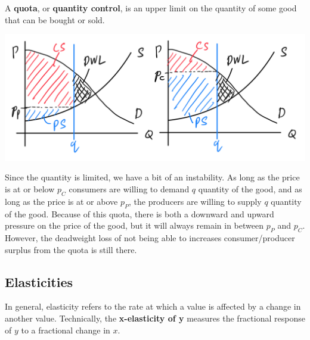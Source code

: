 \documentclass{article}
\begin{document}
    \begin{definition}[Quotas]
      A \textbf{quota}, or \textbf{quantity control}, is an upper limit on the quantity of some good that can be bought or sold. 
      \begin{center}
        \includegraphics[scale=0.25]{img/Quota_DWL.PNG}
      \end{center}
      Since the quantity is limited, we have a bit of an instability. As long as the price is at or below $p_C$ consumers are willing to demand $q$ quantity of the good, and as long as the price is at or above $p_P$, the producers are willing to supply $q$ quantity of the good. Because of this quota, there is both a downward and upward pressure on the price of the good, but it will always remain in between $p_P$ and $p_C$. However, the deadweight loss of not being able to increases consumer/producer surplus from the quota is still there. 
    \end{definition}

  \subsection{Elasticities}

    In general, elasticity refers to the rate at which a value is affected by a change in another value. Technically, the \textbf{x-elasticity of y} measures the fractional response of $y$ to a fractional change in $x$. 
\end{document}
